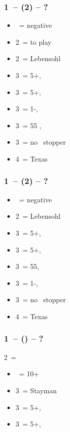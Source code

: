 \documentclass[12pt, a4paper]{report}
\begin{document}
{{{            \subsubsection*{1\ntx\ -- (2\hearts) -- ?}
            \begin{itemize}
                \item \dbl\ = negative
                \item 2\spades\ = to play
                \item 2\nt\ = Lebensohl
                \item 3\clubs\ = 5+\diams, \invp
                \item 3\diams\ = 5+\spades, \invp
                \item 3\hearts\ = 1-\hearts, \invp
                \item 3\spades\ = 55 \minor, \gf
                \item 3\nt\ = no \hearts\ stopper
                \item 4\hearts\ = Texas
            \end{itemize}

            \subsubsection*{1\ntx\ -- (2\spades) -- ?}
            \begin{itemize}
                \item \dbl\ = negative
                \item 2\nt\ = Lebensohl
                \item 3\clubs\ = 5+\diams, \invp
                \item 3\diams\ = 5+\hearts, \invp
                \item 3\hearts\ = 55\minor, \gf
                \item 3\spades\ = 1-\spades, \invp
                \item 3\nt\ = no \spades\ stopper
                \item 4\diams\ = Texas
            \end{itemize}

            \subsubsection*{1\ntx\ -- (\alrts{2\nt}) -- ?}
            2\nt\ = \minor
            \begin{itemize}
                \item \dbl\ = 10+
                \item 3\clubs\ = Stayman
                \item 3\diams\ = 5+\hearts, \invp
                \item 3\hearts\ = 5+\spades, \invp
            \end{itemize}

}}}
\end{document}
